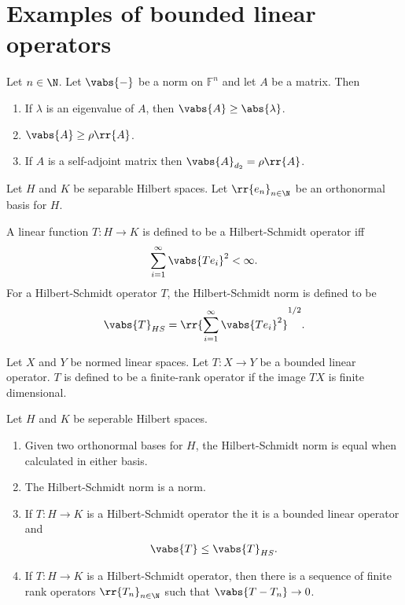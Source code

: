 \documentclass{article}
\begin{document}
\section{Examples of bounded linear operators}

\begin{theorem}
  Let $n\in\N$. Let $\vabs{-}$ be a norm on $\mathbb F^n$ and let $A$ be a matrix. Then
  \begin{enumerate}
    \item If $\lambda$ is an eigenvalue of $A$, then $\vabs{A}\geq \abs{\lambda}$.
    \item $\vabs{A}\geq \rho\rr{A}$.
    \item If $A$ is a self-adjoint matrix then $\vabs{A}_{d_2}=\rho\rr{A}$.
  \end{enumerate}
\end{theorem}

\begin{definition}
  Let $H$ and $K$ be separable Hilbert spaces. Let $\rr{e_n}_{n\in\N}$ be an orthonormal
  basis for $H$.

  A linear function $T:H\to K$ is defined to be a Hilbert-Schmidt operator iff
  \begin{align*}
    \sum_{i=1}^{\infty} \vabs{Te_i}^2<\infty.
  \end{align*}
  For a Hilbert-Schmidt operator $T$, the Hilbert-Schmidt norm is defined to be
  \begin{align*}
    \vabs{T}_{HS}=\rr{\sum_{i=1}^{\infty} \vabs{Te_i}^2}^{1/2}.
  \end{align*}
\end{definition}

\begin{definition}
  Let $X$ and $Y$ be normed linear spaces. Let $T:X\to Y$ be a bounded linear operator. $T$
  is defined to be a finite-rank operator if the image $TX$ is finite dimensional.
\end{definition}

\begin{theorem}
  Let $H$ and $K$ be seperable Hilbert spaces.
  \begin{enumerate}
    \item Given two orthonormal bases for $H$, the Hilbert-Schmidt norm is equal when calculated in either basis.
    \item The Hilbert-Schmidt norm is a norm.
    \item If $T:H\to K$ is a Hilbert-Schmidt operator the it is a bounded linear operator and
      \begin{align*}
        \vabs{T}\leq \vabs{T}_{HS}.
      \end{align*}
    \item If $T:H\to K$ is a Hilbert-Schmidt operator, then there is a sequence of finite rank
      operators $\rr{T_n}_{n\in\N}$ such that $\vabs{T-T_n}\to 0$.
  \end{enumerate}
\end{theorem}
\end{document}
